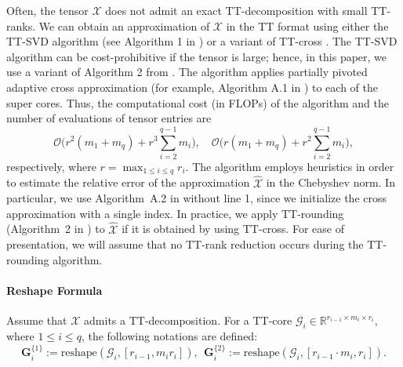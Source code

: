 \documentclass[final,3p,times]{elsarticle}
\newcommand{\mc}[1]{\mathcal{#1}}
\newcommand{\mat}[1]{\boldsymbol{#1}}
\newcommand{\R}{\mathbb{R}}
\newcommand{\ten}[1]{\boldsymbol{\mathcal{#1}}}
\newcommand{\tenh}[1]{\widehat{\boldsymbol{\mc{#1}}}}
\begin{document}
Often, the tensor $\ten{X}$ does not admit an exact TT-decomposition with small TT-ranks.  We can obtain an approximation of $\ten{X}$ in the TT format using either the TT-SVD algorithm (see Algorithm 1 in \cite{oseledets2011tensor}) or a variant of TT-cross \cite{oseledets2010tt, SAVOSTYANOV2014217}. The TT-SVD algorithm can be cost-prohibitive if the tensor is large; hence, in this paper, we use a variant of Algorithm 2 from \cite{SAVOSTYANOV2014217}. The algorithm applies partially pivoted adaptive cross approximation (for example, Algorithm A.1 in \cite{khan2025parametric}) to each of the super cores. Thus, the computational cost (in FLOPs) of the algorithm and the number of evaluations of tensor entries are
\[
\mc{O}\!\Big(r^2(m_1+m_q)+r^3\sum_{i=2}^{q-1} m_i\Big),
\quad
\mc{O}\!\Big(r(m_1+m_q)+r^2\sum_{i=2}^{q-1} m_i\Big),
\]
 respectively, where $r=\max_{1 \le i \le q}r_i$. The algorithm employs  heuristics in order to estimate the relative error of the approximation $\tenh{X}$ in the Chebyshev norm. In particular, we use Algorithm~A.2 in \cite{khan2025parametric} without line 1, since we initialize the cross approximation with a single index. In practice, we apply TT-rounding (Algorithm~2 in \cite{oseledets2011tensor}) to $\tenh{X}$ if it is obtained by using TT-cross. For ease of presentation, we will assume that no TT-rank reduction occurs during the TT-rounding algorithm. 

\paragraph{Reshape Formula} 
Assume that $\ten{X}$ admits a TT-decomposition.
For a  TT-core $\ten{G}_{i} \in \R^{r_{i-1} \times m_i \times r_i}$, where $1 \le i \le q$, the following notations are defined:
$$\mat{G}_{i}^{\{1\}} := \text{reshape}(\ten{G}_{i},[r_{i-1}, m_ir_{i}]), ~ ~ \mat{G}_{i}^{\{2\}} := \text{reshape}(\ten{G}_{i}, [r_{i-1}\cdot m_i, r_{i}]) .$$

\end{document}
